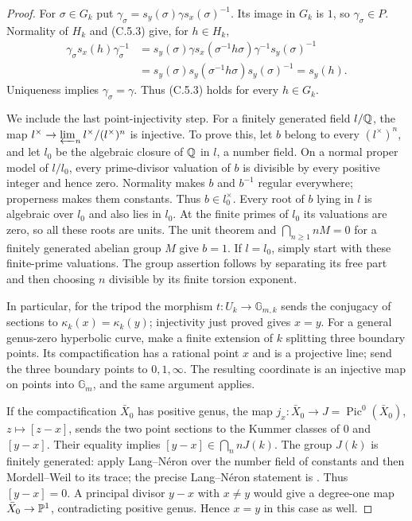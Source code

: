 \begin{proof}
For $\sigma\in G_k$ put
$\gamma_\sigma=s_y(\sigma)\gamma s_x(\sigma)^{-1}$.
Its image in $G_k$ is $1$, so $\gamma_\sigma\in P$. Normality of
$H_k$ and (C.5.3) give, for $h\in H_k$,
\[
 \begin{split}
 \gamma_\sigma s_x(h)\gamma_\sigma^{-1}
 &=s_y(\sigma)\gamma s_x(\sigma^{-1}h\sigma)
                         \gamma^{-1}s_y(\sigma)^{-1}\\
 &=s_y(\sigma)s_y(\sigma^{-1}h\sigma)s_y(\sigma)^{-1}
 =s_y(h).
 \end{split}
\]
Uniqueness implies $\gamma_\sigma=\gamma$. Thus (C.5.3) holds
for every $h\in G_k$.

We include the last point-injectivity step. For a finitely generated
field $l/\mathbb Q$, the map
$l^\times\to\varprojlim_n l^\times/(l^\times)^n$ is injective.
To prove this, let $b$ belong to every $(l^\times)^n$, and let
$l_0$ be the algebraic closure of $\mathbb Q$ in $l$, a number field.
On a normal proper model of $l/l_0$, every prime-divisor valuation
of $b$ is divisible by every positive integer and hence zero.
Normality makes $b$ and $b^{-1}$ regular everywhere; properness
makes them constants. Thus $b\in l_0^\times$. Every root of $b$
lying in $l$ is algebraic over $l_0$ and also lies in $l_0$.
At the finite primes of $l_0$ its valuations are zero, so all these
roots are units. The unit theorem and
$\bigcap_{n\ge1}nM=0$ for a finitely generated abelian group $M$
give $b=1$. If $l=l_0$, simply start with these finite-prime
valuations. The group assertion follows by separating its free
part and then choosing $n$ divisible by its finite torsion exponent.

In particular, for the tripod the morphism $t:U_k\to\mathbb G_{m,k}$
sends the conjugacy of sections to
$\kappa_k(x)=\kappa_k(y)$; injectivity just proved gives $x=y$.
For a general genus-zero hyperbolic curve, make a finite extension
of $k$ splitting three boundary points. Its compactification has a
rational point $x$ and is a projective line; send the three boundary
points to $0,1,\infty$. The resulting coordinate is an injective
map on points into $\mathbb G_m$, and the same argument applies.

If the compactification $\bar X_0$ has positive genus, the map
$j_x:\bar X_0\to J=\operatorname{Pic}^0(\bar X_0)$,
$z\mapsto[z-x]$, sends the two point sections to the Kummer
classes of $0$ and $[y-x]$. Their equality implies
$[y-x]\in\bigcap_n nJ(k)$. The group $J(k)$ is finitely generated:
apply Lang--N\'eron over the number field of constants and then
Mordell--Weil to its trace; the precise Lang--N\'eron statement is
\cite[Theorem 2.1]{AgentConradTrace}. Thus $[y-x]=0$.
A principal divisor $y-x$ with $x\ne y$ would give a degree-one
map $\bar X_0\to\mathbb P^1$, contradicting positive genus. Hence
$x=y$ in this case as well.
\end{proof}

